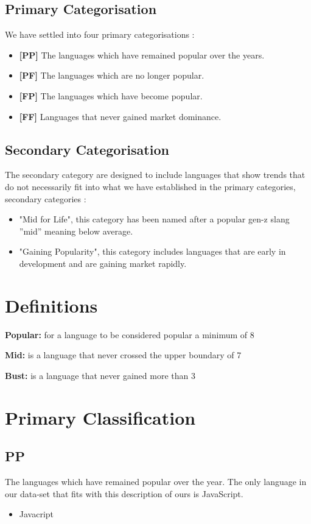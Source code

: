 \documentclass[conference]{IEEEtran}
\begin{document}
\subsection{Primary Categorisation}\label{AA}
We have settled into four primary categorisations : 

\begin{itemize}
\item \textbf{[PP]} The languages which have remained popular over the years.
\item \textbf{[PF]} The languages which are no longer popular.
\item \textbf{[FP]} The languages which have become popular.
\item \textbf{[FF]} Languages that never gained market dominance.
\end{itemize}

\subsection{Secondary Categorisation}
The secondary category are designed to include languages that show  trends that do not necessarily fit into what we have established in the primary categories, secondary categories :
\begin{itemize}
\item "Mid for Life", this category has been named after a popular gen-z slang ''mid'' meaning below average.
\item "Gaining Popularity", this category includes languages that are early in development and are gaining market rapidly.
\end{itemize}

\section{Definitions}
\textbf{Popular:} for a language to be considered popular a minimum of 8%

\textbf{Mid:} is a language that never crossed the upper boundary of 7%

\textbf{Bust:} is a language that never gained more than 3%

\section{Primary Classification}

\subsection{PP}
The languages which have remained popular over the year. The only language in our data-set that fits with this description of ours is JavaScript.
\begin{itemize}
\item{Javacript}
\end{itemize}
\end{document}
